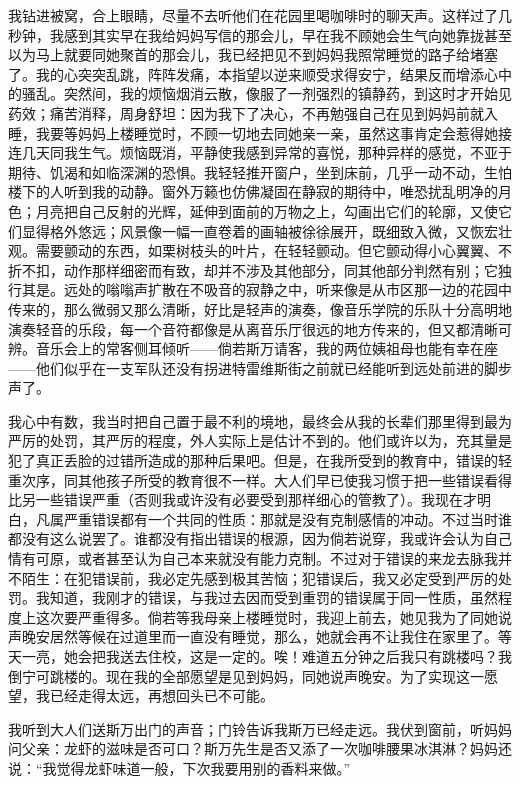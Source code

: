 \par 我钻进被窝，合上眼睛，尽量不去听他们在花园里喝咖啡时的聊天声。这样过了几秒钟，我感到其实早在我给妈妈写信的那会儿，早在我不顾她会生气向她靠拢甚至以为马上就要同她聚首的那会儿，我已经把见不到妈妈我照常睡觉的路子给堵塞了。我的心突突乱跳，阵阵发痛，本指望以逆来顺受求得安宁，结果反而增添心中的骚乱。突然间，我的烦恼烟消云散，像服了一剂强烈的镇静药，到这时才开始见药效；痛苦消释，周身舒坦：因为我下了决心，不再勉强自己在见到妈妈前就入睡，我要等妈妈上楼睡觉时，不顾一切地去同她亲一亲，虽然这事肯定会惹得她接连几天同我生气。烦恼既消，平静使我感到异常的喜悦，那种异样的感觉，不亚于期待、饥渴和如临深渊的恐惧。我轻轻推开窗户，坐到床前，几乎一动不动，生怕楼下的人听到我的动静。窗外万籁也仿佛凝固在静寂的期待中，唯恐扰乱明净的月色；月亮把自己反射的光辉，延伸到面前的万物之上，勾画出它们的轮廓，又使它们显得格外悠远；风景像一幅一直卷着的画轴被徐徐展开，既细致入微，又恢宏壮观。需要颤动的东西，如栗树枝头的叶片，在轻轻颤动。但它颤动得小心翼翼、不折不扣，动作那样细密而有致，却并不涉及其他部分，同其他部分判然有别；它独行其是。远处的嗡嗡声扩散在不吸音的寂静之中，听来像是从市区那一边的花园中传来的，那么微弱又那么清晰，好比是轻声的演奏，像音乐学院的乐队十分高明地演奏轻音的乐段，每一个音符都像是从离音乐厅很远的地方传来的，但又都清晰可辨。音乐会上的常客侧耳倾听——倘若斯万请客，我的两位姨祖母也能有幸在座——他们似乎在一支军队还没有拐进特雷维斯街之前就已经能听到远处前进的脚步声了。
\par 我心中有数，我当时把自己置于最不利的境地，最终会从我的长辈们那里得到最为严厉的处罚，其严厉的程度，外人实际上是估计不到的。他们或许以为，充其量是犯了真正丢脸的过错所造成的那种后果吧。但是，在我所受到的教育中，错误的轻重次序，同其他孩子所受的教育很不一样。大人们早已使我习惯于把一些错误看得比另一些错误严重（否则我或许没有必要受到那样细心的管教了）。我现在才明白，凡属严重错误都有一个共同的性质：那就是没有克制感情的冲动。不过当时谁都没有这么说罢了。谁都没有指出错误的根源，因为倘若说穿，我或许会认为自己情有可原，或者甚至认为自己本来就没有能力克制。不过对于错误的来龙去脉我并不陌生：在犯错误前，我必定先感到极其苦恼；犯错误后，我又必定受到严厉的处罚。我知道，我刚才的错误，与我过去因而受到重罚的错误属于同一性质，虽然程度上这次要严重得多。倘若等我母亲上楼睡觉时，我迎上前去，她见我为了同她说声晚安居然等候在过道里而一直没有睡觉，那么，她就会再不让我住在家里了。等天一亮，她会把我送去住校，这是一定的。唉！难道五分钟之后我只有跳楼吗？我倒宁可跳楼的。现在我的全部愿望是见到妈妈，同她说声晚安。为了实现这一愿望，我已经走得太远，再想回头已不可能。
\par 我听到大人们送斯万出门的声音；门铃告诉我斯万已经走远。我伏到窗前，听妈妈问父亲：龙虾的滋味是否可口？斯万先生是否又添了一次咖啡腰果冰淇淋？妈妈还说：“我觉得龙虾味道一般，下次我要用别的香料来做。”
